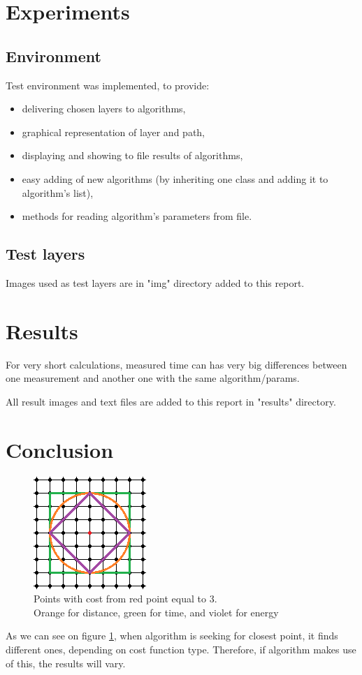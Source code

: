 \documentclass[titlepage]{article}
\begin{document}
\section{Experiments}
\subsection{Environment}
Test environment was implemented, to provide:
\begin{itemize}
\item delivering chosen layers to algorithms,
\item graphical representation of layer and path,
\item displaying and showing to file results of algorithms,
\item easy adding of new algorithms (by inheriting one class and adding it to algorithm's list),
\item methods for reading algorithm's parameters from file.
\end{itemize}

\subsection{Test layers}
Images used as test layers are in "img" directory added to this report.

\section{Results}
For very short calculations, measured time can has very big differences between one measurement and another one with the same algorithm/params.

All result images and text files are added to this report in "results" directory.

\section{Conclusion}
\begin{figure}
\begin{center}
\includegraphics[scale=2]{img/costs}
\end{center}
\caption{Points with cost from red point equal to 3.\\Orange for distance, green for time, and violet for energy}
\label{cost_function_representation}
\end{figure}
As we can see on figure \ref{cost_function_representation}, when algorithm is seeking for closest point, it finds different ones, depending on cost function type. Therefore, if algorithm makes use of this, the results will vary.
\end{document}
